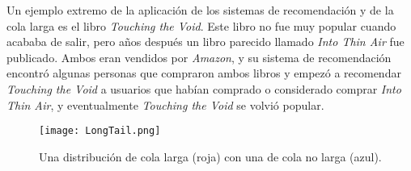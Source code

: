Un ejemplo extremo de la aplicación de los sistemas de recomendación y de la cola larga es el libro \textit{Touching the Void}. Este libro no fue muy popular cuando acababa de salir, pero años después un libro parecido llamado \textit{Into Thin Air} fue publicado. Ambos eran vendidos por \textit{Amazon}, y su sistema de recomendación encontró algunas personas que compraron ambos libros y empezó a recomendar \textit{Touching the Void} a usuarios que habían comprado o considerado comprar \textit{Into Thin Air}, y eventualmente \textit{Touching the Void} se volvió popular.

\begin{figure}
  \centering
    \texttt{[image: LongTail.png]}
  \caption{Una distribución de cola larga (roja) con una de cola no larga (azul).}
  \label{fig:longtailimg}
\end{figure}